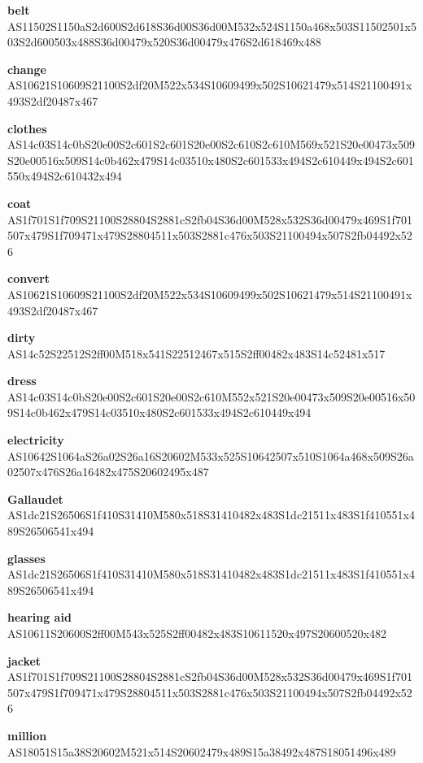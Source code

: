 \documentclass{article}
\begin{document}
\begin{glossary}
\textbf{belt}\\
AS11502S1150aS2d600S2d618S36d00S36d00M532x524S1150a468x503S11502501x503S2d600503x488S36d00479x520S36d00479x476S2d618469x488

\textbf{change}\\
AS10621S10609S21100S2df20M522x534S10609499x502S10621479x514S21100491x493S2df20487x467

\textbf{clothes}\\
AS14c03S14c0bS20e00S2c601S2c601S20e00S2c610S2c610M569x521S20e00473x509S20e00516x509S14c0b462x479S14c03510x480S2c601533x494S2c610449x494S2c601550x494S2c610432x494

\textbf{coat}\\
AS1f701S1f709S21100S28804S2881cS2fb04S36d00M528x532S36d00479x469S1f701507x479S1f709471x479S28804511x503S2881c476x503S21100494x507S2fb04492x526

\textbf{convert}\\
AS10621S10609S21100S2df20M522x534S10609499x502S10621479x514S21100491x493S2df20487x467

\textbf{dirty}\\
AS14c52S22512S2ff00M518x541S22512467x515S2ff00482x483S14c52481x517

\textbf{dress}\\
AS14c03S14c0bS20e00S2c601S20e00S2c610M552x521S20e00473x509S20e00516x509S14c0b462x479S14c03510x480S2c601533x494S2c610449x494

\textbf{electricity}\\
AS10642S1064aS26a02S26a16S20602M533x525S10642507x510S1064a468x509S26a02507x476S26a16482x475S20602495x487

\textbf{Gallaudet}\\
AS1dc21S26506S1f410S31410M580x518S31410482x483S1dc21511x483S1f410551x489S26506541x494

\textbf{glasses}\\
AS1dc21S26506S1f410S31410M580x518S31410482x483S1dc21511x483S1f410551x489S26506541x494

\textbf{hearing aid}\\
AS10611S20600S2ff00M543x525S2ff00482x483S10611520x497S20600520x482

\textbf{jacket}\\
AS1f701S1f709S21100S28804S2881cS2fb04S36d00M528x532S36d00479x469S1f701507x479S1f709471x479S28804511x503S2881c476x503S21100494x507S2fb04492x526

\textbf{million}\\
AS18051S15a38S20602M521x514S20602479x489S15a38492x487S18051496x489


\end{glossary}
\end{document}
